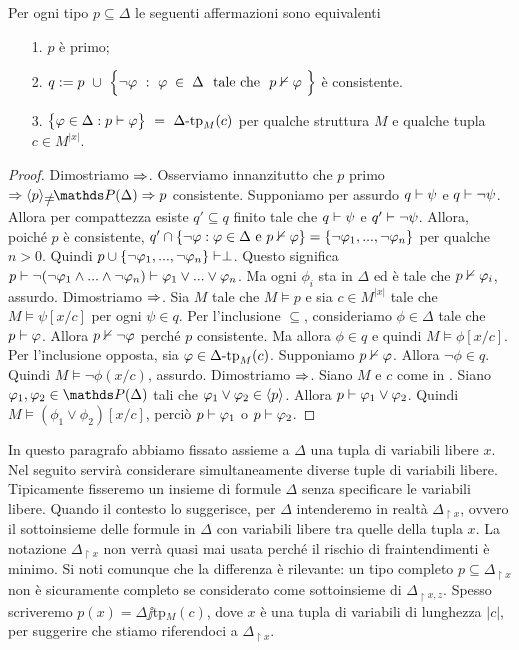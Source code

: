 \begin{lemma}\label{lemmatipiprimiconsistenti}
Per ogni tipo $p\subseteq\Delta$ le seguenti affermazioni sono equivalenti
\begin{itemize}
\item[1.] $p$ \`e primo;
\item[2.] $q:=p\ \cup\ \Big\{\neg\phi\ :\  \phi\;\in\;\Delta\ \ \textrm{tale che}\ \ p\notproves\phi\ \Big\}$ \`e consistente.
\item[3.] $\big\{\phi\in\Delta : p\proves\phi\big\}\ = \ \Deltatp_M(c)$ per qualche struttura $M$ e qualche tupla $c\in M^{|x|}$.
\end{itemize}
\end{lemma}
\begin{proof}
Dimostriamo $\Rightarrow$. Osserviamo innanzitutto che $p$ primo $\IMP \<p\> \neq \PP(\Delta) \IMP p$ consistente. Supponiamo per assurdo $q \vdash \psi$ e $q \vdash \neg \psi$. Allora per compattezza esiste $q' \subseteq q$ finito tale che $q \vdash \psi$ e $q' \vdash \neg\psi$. 
Allora, poich\'e $p$ \`e consistente, $q' \cap \{ \neg\varphi : \varphi \in \Delta \text{ e } p \nvdash \varphi \} = \{\neg\varphi_1,...,\neg\varphi_n\}$ per qualche $n>0$. Quindi $p \cup \{\neg\varphi_1,...,\neg\varphi_n\} \vdash \perp$. Questo significa $p \vdash \neg(\neg\varphi_1 \wedge ... \wedge \neg\varphi_n) \vdash \varphi_1 \vee ... \vee \varphi_n$. Ma ogni $\phi_i$ sta in $\Delta$ ed \`e tale che $p \nvdash \varphi_i$, assurdo.
Dimostriamo $\Rightarrow$. Sia $M$ tale che $M \models p$ e sia $c\in M^{|x|}$ tale che $M \models \psi[x/c]$ per ogni $\psi \in q$. Per l'inclusione $\subseteq$, consideriamo $\phi \in \Delta$ tale che $p \vdash \varphi$. Allora $p \nvdash \neg\varphi$ perch\'e $p$ consistente. Ma allora $\phi \in q$ e quindi $M \models \phi[x/c]$. Per l'inclusione opposta, sia $\varphi \in \Delta\mbox{-}\textrm{tp}_M(c)$. Supponiamo $p \nvdash \varphi$. Allora $\neg\phi \in q$. Quindi $M \models \neg\phi(x/c)$, assurdo. Dimostriamo $\Rightarrow$. Siano $M$ e $c$ come in . Siano $\phi_1,\phi_2 \in \PP(\Delta)$ tali che $\varphi_1 \vee \varphi_2 \in \langle p\rangle$. Allora $p \vdash \varphi_1 \vee \varphi_2$. Quindi $M \models (\phi_1 \vee \phi_2)[x/c]$, perci\`o $p \vdash \varphi_1$ o $p \vdash \varphi_2$.
\end{proof}

In questo paragrafo abbiamo fissato assieme a $\Delta$ una tupla di variabili libere $x$. Nel seguito servir\`a considerare simultaneamente diverse tuple di variabili libere. Tipicamente fisseremo un insieme di formule $\Delta$ senza specificare le variabili libere. Quando il contesto lo suggerisce, per $\Delta$ intenderemo in realt\`a \emph{$\Delta_{\restriction x}$}, ovvero il sottoinsieme delle formule in $\Delta$ con variabili libere tra quelle della tupla $x$. La notazione  $\Delta_{\restriction x}$ non verr\`a quasi mai usata perch\'e il rischio di fraintendimenti \`e minimo. Si noti comunque che la differenza \`e rilevante: un tipo completo $p\subseteq\Delta_{\restriction x}$ non \`e sicuramente completo se considerato come sottoinsieme di $\Delta_{\restriction x,z}$. Spesso scriveremo $p(x)=\Delta\jj$tp$_M(c)$, dove $x$ \`e una tupla di variabili di lunghezza $|c|$, per suggerire che stiamo riferendoci a $\Delta_{\restriction x}$. 

